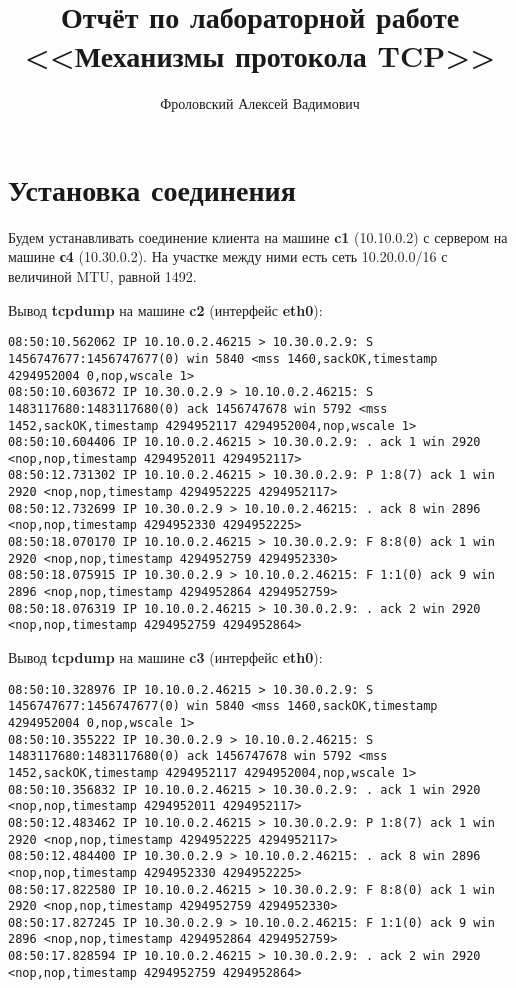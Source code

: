 \documentclass[a4paper,12pt]{article}
\title{Отчёт по лабораторной работе \\ <<Механизмы протокола TCP>>}
\author{Фроловский Алексей Вадимович}
\begin{document}
\maketitle

\tableofcontents


\section{Установка соединения}

Будем устанавливать соединение клиента на машине \textbf{c1} (10.10.0.2) с сервером
на машине \textbf{с4} (10.30.0.2). На участке между ними есть сеть 10.20.0.0/16 с
величиной MTU, равной 1492.

Вывод \textbf{tcpdump} на машине \textbf{c2} (интерфейс \textbf{eth0}):
\begin{Verbatim}
08:50:10.562062 IP 10.10.0.2.46215 > 10.30.0.2.9: S 1456747677:1456747677(0) win 5840 <mss 1460,sackOK,timestamp 4294952004 0,nop,wscale 1>
08:50:10.603672 IP 10.30.0.2.9 > 10.10.0.2.46215: S 1483117680:1483117680(0) ack 1456747678 win 5792 <mss 1452,sackOK,timestamp 4294952117 4294952004,nop,wscale 1>
08:50:10.604406 IP 10.10.0.2.46215 > 10.30.0.2.9: . ack 1 win 2920 <nop,nop,timestamp 4294952011 4294952117>
08:50:12.731302 IP 10.10.0.2.46215 > 10.30.0.2.9: P 1:8(7) ack 1 win 2920 <nop,nop,timestamp 4294952225 4294952117>
08:50:12.732699 IP 10.30.0.2.9 > 10.10.0.2.46215: . ack 8 win 2896 <nop,nop,timestamp 4294952330 4294952225>
08:50:18.070170 IP 10.10.0.2.46215 > 10.30.0.2.9: F 8:8(0) ack 1 win 2920 <nop,nop,timestamp 4294952759 4294952330>
08:50:18.075915 IP 10.30.0.2.9 > 10.10.0.2.46215: F 1:1(0) ack 9 win 2896 <nop,nop,timestamp 4294952864 4294952759>
08:50:18.076319 IP 10.10.0.2.46215 > 10.30.0.2.9: . ack 2 win 2920 <nop,nop,timestamp 4294952759 4294952864>
\end{Verbatim}

Вывод \textbf{tcpdump} на машине \textbf{c3} (интерфейс \textbf{eth0}):
\begin{Verbatim}
08:50:10.328976 IP 10.10.0.2.46215 > 10.30.0.2.9: S 1456747677:1456747677(0) win 5840 <mss 1460,sackOK,timestamp 4294952004 0,nop,wscale 1>
08:50:10.355222 IP 10.30.0.2.9 > 10.10.0.2.46215: S 1483117680:1483117680(0) ack 1456747678 win 5792 <mss 1452,sackOK,timestamp 4294952117 4294952004,nop,wscale 1>
08:50:10.356832 IP 10.10.0.2.46215 > 10.30.0.2.9: . ack 1 win 2920 <nop,nop,timestamp 4294952011 4294952117>
08:50:12.483462 IP 10.10.0.2.46215 > 10.30.0.2.9: P 1:8(7) ack 1 win 2920 <nop,nop,timestamp 4294952225 4294952117>
08:50:12.484400 IP 10.30.0.2.9 > 10.10.0.2.46215: . ack 8 win 2896 <nop,nop,timestamp 4294952330 4294952225>
08:50:17.822580 IP 10.10.0.2.46215 > 10.30.0.2.9: F 8:8(0) ack 1 win 2920 <nop,nop,timestamp 4294952759 4294952330>
08:50:17.827245 IP 10.30.0.2.9 > 10.10.0.2.46215: F 1:1(0) ack 9 win 2896 <nop,nop,timestamp 4294952864 4294952759>
08:50:17.828594 IP 10.10.0.2.46215 > 10.30.0.2.9: . ack 2 win 2920 <nop,nop,timestamp 4294952759 4294952864>
\end{Verbatim}
\end{document}

